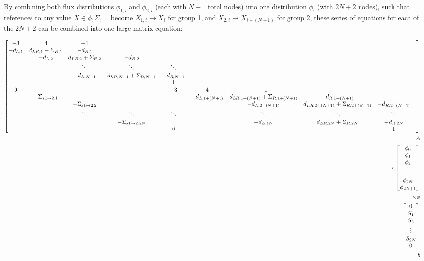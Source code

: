 \documentclass[11pt]{article} %
\begin{document}
By combining both flux distributions $\phi_{1,i}$ and $\phi_{2,i}$ (each with $N+1$ total nodes) into one distribution $\phi_i$ (with $2N+2$ nodes), such that references to any value $X\in\phi, \Sigma, \dots$ become $X_{1,i}\rightarrow X_i$ for group 1, and $X_{2,i}\rightarrow X_{i+(N+1)}$ for group 2, these series of equations for each of the $2N+2$ can be combined into one large matrix equation:

\newcommand{\downscat}[1]{\Sigma_{s1\rightarrow2,#1}}
\begin{landscape}
    \small
    \begin{equation}
        \begin{aligned}
    \begin{bmatrix}
        -3 & 4 & -1 & & &   &&&&  \\
        -\dL{1} & \dLR{1}+\Sigma_{R,1} & -\dR{1} && &&&&\\
        & -\dL{2} & \dLR{2}+\Sigma_{R,2} & -\dR{2} & &&&&\\
        &&\ddots& \ddots & \ddots &&&&\\
        &&-\dL{N-1} & \dLR{N-1}+\Sigma_{R,N-1} & -\dR{N-1} &&&&\\
        &&&&1 &&&&\\
        0&&&& -3 & 4 & -1 & & &     \\
        &-\downscat{1}&&&&   -\dL{1+(N+1)} & \dLR{1+(N+1)}+\Sigma_{R,1+(N+1)} & -\dR{1+(N+1)} &&\\
        &&-\downscat{2}&&&&   -\dL{2+(N+1)} & \dLR{2+(N+1)}+\Sigma_{R,2+(N+1)} & -\dR{2+(N+1)} &\\
        &&\ddots& \ddots & \ddots &&\ddots& \ddots & \ddots\\
        && & -\downscat{2N} & &&-\dL{2N} & \dLR{2N}+\Sigma_{R,2N} & -\dR{2N}\\
        &&&&0 &&&&1 \\
    \end{bmatrix}&\\
    A&\\
    \times\begin{bmatrix}
        \phi_0\\\phi_1\\\phi_2\\\vdots\\\phi_{2N}\\\phi_{2N+1}
    \end{bmatrix}&\\
    \times \phi&\\
    =
    \begin{bmatrix}
        0\\S_1\\S_2\\\vdots\\S_{2N}\\0
    \end{bmatrix}& \\
    =b&\\
        \end{aligned}
    \end{equation}
    \label{eq:p1_mat}
\end{landscape}
\end{document}
